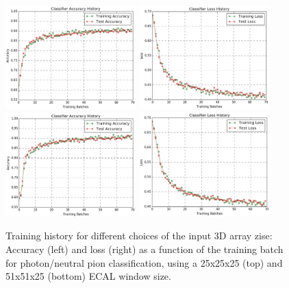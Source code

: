 \begin{figure}[htbp]
    \centering
    \includegraphics[width=0.45\textwidth]{Images/Calo/accuracy_small_window.png}
    \includegraphics[width=0.45\textwidth]{Images/Calo/loss_small_window.png} \\
    \includegraphics[width=0.45\textwidth]{Images/Calo/accuracy_large_window.png}
    \includegraphics[width=0.45\textwidth]{Images/Calo/loss_large_window.png}
    \caption{Training history for different choices of the input 3D array zise: Accuracy (left) and loss (right) as a function of the training batch for photon/neutral pion classification, using a 25x25x25 (top) and 51x51x25 (bottom) ECAL window size.\label{fig:classification_window}}
\end{figure}